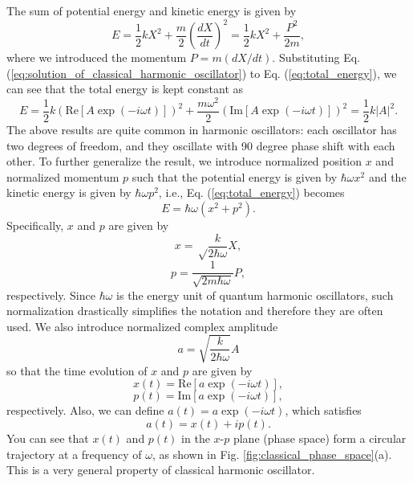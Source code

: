 \documentclass{book}
\begin{document}
The sum of potential energy and kinetic energy is given by
\begin{equation}
  E = \frac{1}{2}kX^2 + \frac{m}{2}\left(\frac{dX}{dt} \right)^2 = \frac{1}{2}kX^2 + \frac{P^2}{2m},
  \label{eq:total_energy}
\end{equation}
where we introduced the momentum $P = m(dX/dt)$. Substituting Eq. (\ref{eq:solution_of_classical_harmonic_oscillator}) to Eq. (\ref{eq:total_energy}), we can see that the total energy is kept constant as
\begin{equation}
  E= \frac{1}{2}k(\mathrm{Re} [A\exp(-i\omega t)])^2 + \frac{m\omega^2}{2} (\mathrm{Im} [A\exp(-i\omega t)])^2 = \frac{1}{2}k|A|^2.
\end{equation}
The above results are quite common in harmonic oscillators: each oscillator has two degrees of freedom, and they oscillate with 90 degree phase shift with each other. To further generalize the result, we introduce normalized position $x$ and normalized momentum $p$ such that the potential energy is given by $\hbar \omega x^2$ and the kinetic energy is given by $\hbar \omega p^2$, i.e., Eq. (\ref{eq:total_energy}) becomes
\begin{equation}
  E = \hbar \omega (x^2 + p^2).
\end{equation}
Specifically, $x$ and $p$ are given by
\begin{equation}
  x = \sqrt \frac{k}{2\hbar\omega} X,
  \label{eq:normalized_position}
\end{equation}
\begin{equation}
  p = \frac{1}{\sqrt{2m\hbar \omega}}P,
  \label{eq:normalized_momentum}
\end{equation}
respectively. Since $\hbar \omega$ is the energy unit of quantum harmonic oscillators, such normalization drastically simplifies the notation and therefore they are often used. We also introduce normalized complex amplitude
\begin{equation}
  a = \sqrt{\frac{k}{2\hbar \omega}}A
\end{equation}
so that the time evolution of $x$ and $p$ are given by
\begin{equation}
  x(t) = \mathrm{Re}[a \exp(-i\omega t)],
\end{equation}
\begin{equation}
  p(t) = \mathrm{Im}[a \exp(-i\omega t)],
\end{equation}
respectively. Also, we can define $a(t) = a\exp(-i\omega t)$, which satisfies
\begin{equation}
  a(t) = x(t) + ip(t).
\end{equation}
You can see that $x(t)$ and $p(t)$ in the $x$-$p$ plane (phase space) form a circular trajectory at a frequency of $\omega$, as shown in Fig. {\ref{fig:classical_phase_space}}(a). This is a very general property of classical harmonic oscillator. 
\end{document}
